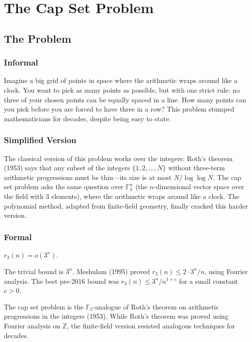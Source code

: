 \let\LocalMacro\relax

\chapter{The Cap Set Problem}

\section{The Problem}

\subsection{Informal}
Imagine a big grid of points in space where the arithmetic wraps around like a clock. You want to pick as many points as possible, but with one strict rule: no three of your chosen points can be equally spaced in a line. How many points can you pick before you are forced to have three in a row? This problem stumped mathematicians for decades, despite being easy to state.

\subsection{Simplified Version}
The classical version of this problem works over the integers: Roth's theorem (1953) says that any subset of the integers $\{1, 2, \ldots, N\}$ without three-term arithmetic progressions must be thin---its size is at most $N / \log \log N$. The cap set problem asks the same question over $\mathbb{F}_3^n$ (the $n$-dimensional vector space over the field with 3 elements), where the arithmetic wraps around like a clock. The polynomial method, adapted from finite-field geometry, finally cracked this harder version.

\subsection{Formal}
\begin{conjecture}
$r_3(n) = o(3^n)$.
\end{conjecture}

The trivial bound is $3^n$. Meshulam (1995) proved $r_3(n) \le 2 \cdot 3^n / n$, using Fourier analysis. The best pre-2016 bound was $r_3(n) \le 3^n / n^{1+c}$ for a small constant $c > 0$.

\begin{historicalbox}
The cap set problem is the $\mathbb{F}_3$-analogue of Roth's theorem on arithmetic progressions in the integers (1953). While Roth's theorem was proved using Fourier analysis on $\mathbb{Z}$, the finite-field version resisted analogous techniques for decades.
\end{historicalbox}

